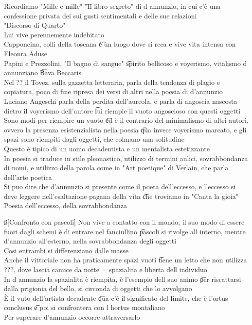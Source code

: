 \documentclass[12pt]{article}
\begin{document}
Ricordiamo "Mille e mille" \t "Il libro segreto" di d annunzio, in cui c'è una confessione privata dei sui gusti sentimentali e delle sue relazioni \\
"Discorso di Quarto" \\
Lui vive perennemente indebitato \\
Capponcina, colli della toscana \t è un luogo dove si reca e vive vita intensa con Eleonra Aduse \\
Papini e Prezzolini, "Il bagno di sangue" \t spirito bellicoso e voyerismo, vitalismo d annunziano \t Bava Beccaris \\
Nel ?? il Tovez, sulla gazzetta letteraria, parla della tendenza di plagio e copiatura, poco di fine ripresa dei versi di altri nella poesia di d'annunzio \\
Luciano Angeschi parla della perdita dell'aureola, e parla di angoscia nascosta dietro il voyerismo dell'autore \t lui riempie il vuoto angoscioso con questi oggetti \\
Sono modi per riempire un vuoto \t ed è il contrario del minimalismo di altri autori, ovvero la presenza esistenzialista nella poesia \t qua invece voyerismo marcato, e gli spazi sono riempiti dagli oggetti, che colmano una solitudine \\
Questo è tipico di un uomo decadentista e un mentalista estetizzante \\
In poesia si traduce in stile pleonastico, utilizzo di termini aulici, sovrabbondanza di nomi, e utilizzo della parola come in "Art poetique" di Verlain, che parla dell'arte poetica \\
Si puo dire che d'annunzio si presente come il poeta dell'eccesso, e l'eccesso si deve leggere nell'esaltazione pagana della vita \t che troviamo in "Canta la gioia" \\
Poesia dell'eccesso, della sovrabbondanza

\ss[Confronto con pascoli]
Non vive a contatto con il mondo, il suo modo di essere fuori dagli schemi è di entrare nel fanciullino \t pascoli si rivolge all interno, mentre d'annunzio all'esterno, nella sovrabbondanza degli oggetti \\
Cosi entrambi si differenziano dalle masse \\
Anche il vittoriale non ha praticamente spazi vuoti \t tiene un letto che non utilizza ???, dove lascia camice da notte = spazialita e liberta dell individuo \\
In d annunzio la spazialita è riempita, è l'esempio dell suo animo \t per riscattarsi dalla prigionia del bello, si circonda di oggetti che lo avvolgano \\
È il vuto dell'artista decadente \t qua c'è il significato del limite, che è l'ortus conclusus \t e poi si confrontera con l hortus montaliano \\
Per superare d'annunzio occorre attraversarlo
\end{document}
